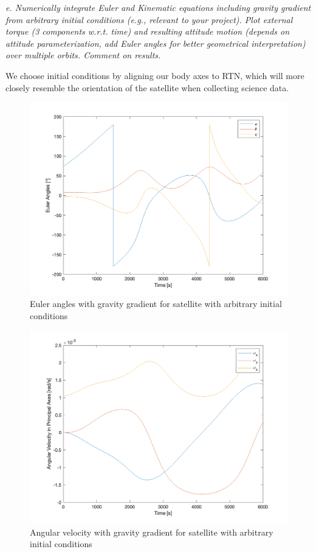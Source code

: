 \textit{e. Numerically integrate Euler and Kinematic equations including gravity gradient from arbitrary initial conditions (e.g., relevant to your project). Plot external torque (3 components w.r.t. time) and resulting attitude motion (depends on attitude parameterization, add Euler angles for better geometrical interpretation) over multiple orbits. Comment on results.}

We choose initial conditions by aligning our body axes to RTN, which will more closely resemble the orientation of the satellite when collecting science data.

\begin{figure}[H]
\centering
\includegraphics[scale=0.6]{Images/ps4_problem4e_angle.png}
\caption{Euler angles with gravity gradient for satellite with arbitrary initial conditions}
\label{fig:ps4_problem4e_angle}
\end{figure}

\begin{figure}[H]
\centering
\includegraphics[scale=0.6]{Images/ps4_problem4e_angvel.png}
\caption{Angular velocity with gravity gradient for satellite with arbitrary initial conditions}
\label{fig:ps4_problem4e_angvel}
\end{figure}

